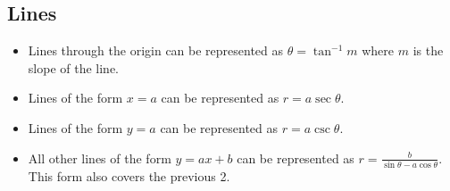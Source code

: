 \subsection{Lines}
\begin{itemize}
	\item Lines through the origin can be represented as $\theta = \tan^{-1}{m}$ where $m$ is the slope of the line.
	\item Lines of the form $x = a$ can be represented as $r = a\sec{\theta}$.
	\item Lines of the form $y = a$ can be represented as $r = a\csc{\theta}$.
	\item All other lines of the form $y=ax+b$ can be represented as $r = \frac{b}{\sin{\theta} - a\cos{\theta}}$. This form also covers the previous 2.
\end{itemize}